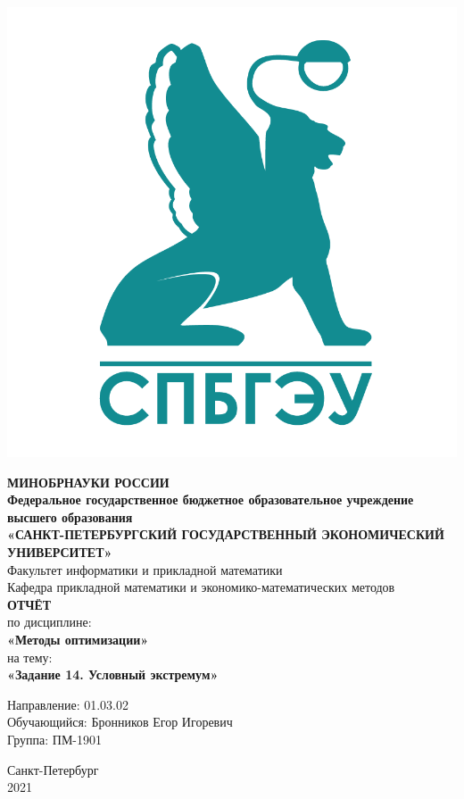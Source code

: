 \documentclass[14pt,a4paper,fleqn]{extarticle}
\begin{document}
	\begin{titlepage}
		\includegraphics[scale=0.12]{logo}
		\begin{center}
			\textbf{МИНОБРНАУКИ РОССИИ}\\
			\vspace{0.2cm}
			\textbf{Федеральное государственное бюджетное образовательное учреждение высшего образования}\\
			\textbf{«САНКТ-ПЕТЕРБУРГСКИЙ ГОСУДАРСТВЕННЫЙ ЭКОНОМИЧЕСКИЙ УНИВЕРСИТЕТ»}\\
			\vspace{0.6cm}
			Факультет информатики и прикладной математики\\
			Кафедра прикладной математики и экономико-математических методов\\
			\vspace{1cm}
			\textbf{ОТЧЁТ}\\
			по дисциплине:\\
			\textbf{«Методы оптимизации»}\\
			на тему:\\
			\textbf{«Задание 14. Условный экстремум»}\\
		\end{center}
		\vspace{1cm}
		Направление: 01.03.02\\
		Обучающийся: Бронников Егор Игоревич\\
		Группа: ПМ-1901\\
		\vfill
		\begin{center}
			Санкт-Петербург\\
			2021\\
		\end{center}
	\end{titlepage}
\end{document}
